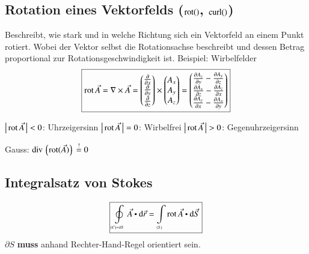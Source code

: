 \subsection[Rotation eines Vektorfelds (rot(), curl())]{Rotation eines Vektorfelds ($\operatorname{rot}()$, $\operatorname{curl}()$)}
Beschreibt, wie stark und in welche Richtung sich ein Vektorfeld an einem Punkt rotiert. Wobei der Vektor selbst die Rotationsachse beschreibt 
und dessen Betrag proportional zur Rotationsgeschwindigkeit ist.
Beispiel: Wirbelfelder
\[
    \boxed{%
        \rot \vec{A}
        = \nabla \times \vec{A}
        =   \begin{pmatrix}
                \frac{\partial}{\partial x}\\
                \frac{\partial}{\partial y}\\
                \frac{\partial}{\partial z}
            \end{pmatrix} \times 
        \begin{pmatrix}
            A_x \\ A_y \\ A_z
        \end{pmatrix} =
        \begin{pmatrix}
            \frac{\partial A_z}{\partial y} - \frac{\partial A_y}{\partial z}\\
            \frac{\partial A_x}{\partial z} - \frac{\partial A_z}{\partial x}\\
            \frac{\partial A_y}{\partial x} - \frac{\partial A_x}{\partial y}
        \end{pmatrix}
    }
\]

\begin{outline}
    \1 $\big|\operatorname{rot} \vec{A}\,\big| < 0$: Uhrzeigersinn
    \1 $\big|\operatorname{rot} \vec{A}\,\big| = 0$: Wirbelfrei
    \1 $\big|\operatorname{rot} \vec{A}\,\big| > 0$: Gegenuhrzeigersinn
\end{outline}

Gauss: $\operatorname{div} \left\lgroup\operatorname{rot}(\vec{A})\right\rgroup \overset{!}{=} 0$ %


\subsection{Integralsatz von Stokes}
\[
    \boxed{\oint\limits_{\scriptscriptstyle (C) = \partial S} \vec{A} \dotp \diff \vec{r} = \int\limits_{\scriptscriptstyle (S)} \rot \vec{A} \dotp \diff \vec{S}}
\]
$\partial S$ \textbf{muss} anhand Rechter-Hand-Regel orientiert sein.

